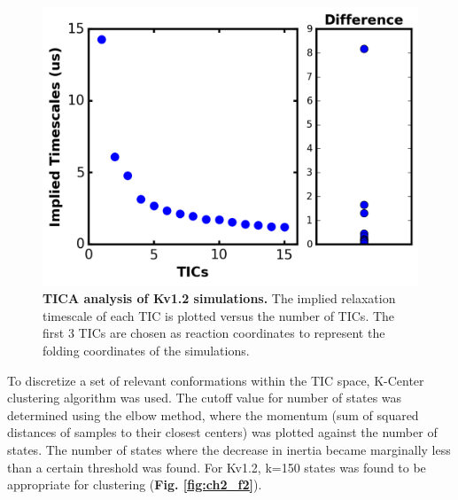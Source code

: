 \begin{figure}[!ht]
\begin{center}
	\includegraphics[width=\textwidth]{figures/chapter2/Fig2-1_implied_timescale.png}
\end{center}
	\caption{\textbf{TICA analysis of Kv1.2 simulations.} The implied relaxation timescale of each TIC is plotted versus the number of TICs. The first 3 TICs are chosen as reaction coordinates to represent the folding coordinates of the simulations.}
	\label{fig:ch2_f1}
\end{figure}

To discretize a set of relevant conformations within the TIC space, K-Center clustering algorithm was used. The cutoff value for number of states was determined using the elbow method, where the momentum (sum of squared distances of samples to their closest centers) was plotted against the number of states. The number of states where the decrease in inertia became marginally less than a certain threshold was found. For Kv1.2, k=150 states was found to be appropriate for clustering (\textbf{Fig. \ref{fig:ch2_f2}}).

